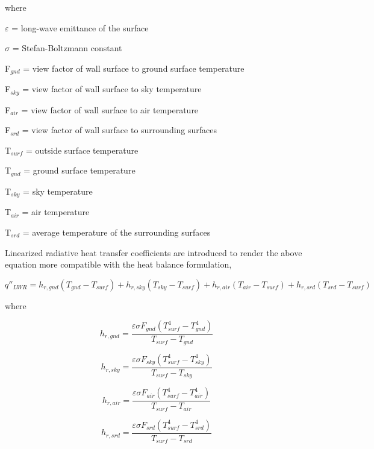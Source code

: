 where

$\varepsilon$ = long-wave emittance of the surface

$\sigma$ = Stefan-Boltzmann constant

F\(_{gnd}\) = view factor of wall surface to ground surface temperature

F\(_{sky}\) = view factor of wall surface to sky temperature

F\(_{air}\) = view factor of wall surface to air temperature

F\(_{srd}\) = view factor of wall surface to surrounding surfaces

T\(_{surf}\) = outside surface temperature

T\(_{gnd}\) = ground surface temperature

T\(_{sky}\) = sky temperature

T\(_{air}\) = air temperature

T\(_{srd}\) = average temperature of the surrounding surfaces

Linearized radiative heat transfer coefficients are introduced to render the above equation more compatible with the heat balance formulation,

\begin{equation}
{q''_{LWR}} = {h_{r,gnd}}({T_{gnd}} - {T_{surf}}) + {h_{r,sky}}({T_{sky}} - {T_{surf}}) + {h_{r,air}}({T_{air}} - {T_{surf}}) + {h_{r,srd}}({T_{srd}} - {T_{surf}})
\end{equation}

where

\begin{equation}
{h_{r,gnd}} = \frac{{\varepsilon \sigma {F_{gnd}}(T_{surf}^4 - T_{gnd}^4)}}{{{T_{surf}} - {T_{gnd}}}}
\end{equation}

\begin{equation}
{h_{r,sky}} = \frac{{\varepsilon \sigma {F_{sky}}(T_{surf}^4 - T_{sky}^4)}}{{{T_{surf}} - {T_{sky}}}}
\end{equation}

\begin{equation}
{h_{r,air}} = \frac{{\varepsilon \sigma {F_{air}}(T_{surf}^4 - T_{air}^4)}}{{{T_{surf}} - {T_{air}}}}
\end{equation}

\begin{equation}
{h_{r,srd}} = \frac{{\varepsilon \sigma {F_{srd}}(T_{surf}^4 - T_{srd}^4)}}{{{T_{surf}} - {T_{srd}}}}
\end{equation}

